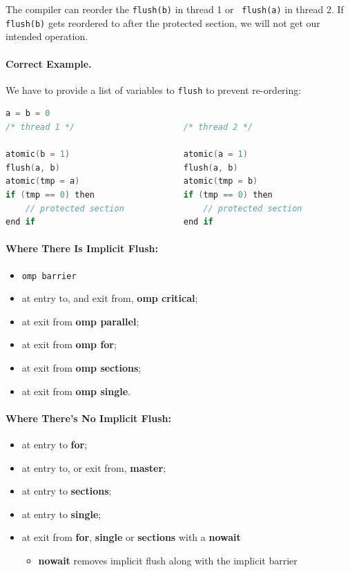 \documentclass[a4paper]{report}
\begin{document}
The compiler can reorder the {\tt flush(b)} in thread 1 or {\tt
  flush(a)} in thread 2. If {\tt flush(b)} gets reordered to after the
protected section, we will not get our intended operation.

\paragraph{Correct Example.} We have to provide a list of variables
to {\tt flush} to prevent re-ordering:
  \begin{lstlisting}[language=C]
                    a = b = 0
/* thread 1 */                      /* thread 2 */

atomic(b = 1)                       atomic(a = 1)
flush(a, b)                         flush(a, b)
atomic(tmp = a)                     atomic(tmp = b)
if (tmp == 0) then                  if (tmp == 0) then
    // protected section                // protected section
end if                              end if
  \end{lstlisting}

\paragraph{Where There Is Implicit Flush:}
  \begin{itemize}[noitemsep]
    \item {\tt omp barrier}
    \item at entry to, and exit from, {\bf omp critical};
    \item at exit from {\bf omp parallel}; 
    \item at exit from {\bf omp for};
    \item at exit from {\bf omp sections};
    \item at exit from {\bf omp single}.
  \end{itemize}

\paragraph{Where There's No Implicit Flush:}
  \begin{itemize}[noitemsep]
    \item at entry to {\bf for};
    \item at entry to, or exit from, {\bf master};
    \item at entry to {\bf sections};
    \item at entry to {\bf single};
    \item at exit from {\bf for}, {\bf single} or {\bf sections} with a {\bf nowait}
      \begin{itemize}
        \item {\bf nowait} removes implicit flush along with the implicit barrier
      \end{itemize}
  \end{itemize}
\end{document}
